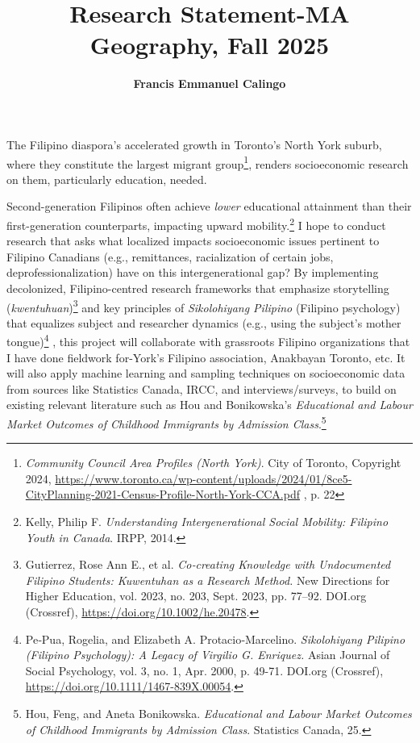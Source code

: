 \documentclass{article}
\begin{document}
\title{\color{red} \textbf{Research Statement-MA Geography, Fall 2025}}
\author{\color{red} \textbf{Francis Emmanuel Calingo}}


\date{}

\maketitle
\thispagestyle{empty}

\vspace{20pt}

The Filipino diaspora’s accelerated growth in Toronto’s North York suburb, where they constitute the largest migrant group\footnote{\textit{Community Council Area Profiles (North York)}. City of Toronto, Copyright 2024, \url{https://www.toronto.ca/wp-content/uploads/2024/01/8ce5-CityPlanning-2021-Census-Profile-North-York-CCA.pdf} , p. 22
}, renders socioeconomic research on them, particularly education, needed. 

\vspace{10pt}

Second-generation Filipinos often achieve \textit{lower} educational attainment than their first-generation counterparts, impacting upward mobility.\footnote{Kelly, Philip F. \textit{Understanding Intergenerational Social Mobility: Filipino Youth in Canada}. IRPP, 2014.
} I hope to conduct research that asks what localized impacts socioeconomic issues pertinent to Filipino Canadians (e.g., remittances, racialization of certain jobs, deprofessionalization) have on this intergenerational gap? By implementing decolonized, Filipino-centred research frameworks that emphasize storytelling (\textit{kwentuhuan})\footnote{Gutierrez, Rose Ann E., et al. \textit{Co‐creating Knowledge with Undocumented Filipino Students: Kuwentuhan as a Research Method.} New Directions for Higher Education, vol. 2023, no. 203, Sept. 2023, pp. 77–92. DOI.org (Crossref), \url{https://doi.org/10.1002/he.20478}.} and key principles of \textit{Sikolohiyang Pilipino} (Filipino psychology) that equalizes subject and researcher dynamics (e.g., using the subject’s mother tongue)\footnote{Pe‐Pua, Rogelia, and Elizabeth A. Protacio‐Marcelino. \textit{Sikolohiyang Pilipino (Filipino Psychology): A Legacy of Virgilio G. Enriquez.} Asian Journal of Social Psychology, vol. 3, no. 1, Apr. 2000, p. 49-71. DOI.org (Crossref), \url{https://doi.org/10.1111/1467-839X.00054}.
}
, this project will collaborate with grassroots Filipino organizations that I have done fieldwork for-York’s Filipino association, Anakbayan Toronto, etc. It will also apply machine learning and sampling techniques on socioeconomic data from sources like Statistics Canada, IRCC, and interviews/surveys, to build on existing relevant literature such as Hou and Bonikowska’s \textit{Educational and Labour Market Outcomes of Childhood Immigrants by Admission Class}.\footnote{Hou, Feng, and Aneta Bonikowska. \textit{Educational and Labour Market Outcomes of Childhood Immigrants by Admission Class}. Statistics Canada, 25.}
\end{document}
